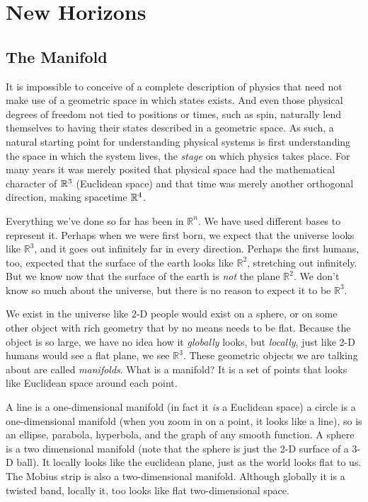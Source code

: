 	
	\chapter{New Horizons}
	
	\section{The Manifold} %
	\label{sec:the_manifold}

	It is impossible to conceive of a complete description of physics that need not make use of a geometric space in which states exists.  And even those physical degrees of freedom not tied to positions or times, such as spin, naturally lend themselves to having their states described in a geometric space.  As such, a natural starting point for understanding physical systems is first understanding the space in which the system lives, the \textit{stage} on which physics takes place.  For many years it was merely posited that physical space had the mathematical character of $\mathbb{R}^3$ (Euclidean space) and that time was merely another orthogonal direction, making spacetime $\mathbb{R}^4$. 

	Everything we've done so far has been in $\mathbb{R}^n$. We have used different bases to represent it. Perhaps when we were first born, we expect that the universe looks like $\mathbb{R}^3$, and it goes out infinitely far in every direction.  Perhaps the first humans, too, expected that the surface of the earth looks like $\mathbb R^2$, stretching out infinitely. But we know now that the surface of the earth is \emph{not} the plane $\mathbb R^2$. We don't know so much about the universe, but there is no reason to expect it to be $\mathbb R^3$.
	
	We exist in the universe like 2-D people would exist on a sphere, or on some other object with rich geometry that by no means needs to be flat. Because the object is so large, we have no idea how it \emph{globally} looks, but \emph{locally}, just like 2-D humans would see a flat plane, we see $\mathbb R^3$. These geometric objects we are talking about are called \emph{manifolds}. What is a manifold? It is a set of points that looks like Euclidean space around each point.
	
	A line is a one-dimensional manifold (in fact it \emph{is} a Euclidean space) a circle is a one-dimensional manifold (when you zoom in on a point, it looks like a line), so is an ellipse, parabola, hyperbola, and the graph of any smooth function. A sphere is a two dimensional manifold (note that the sphere is just the 2-D surface of a 3-D ball). It locally looks like the euclidean plane, just as the world looks flat to us. The Mobius strip is also a two-dimensional manifold. Although globally it is a twisted band, locally it, too looks like flat two-dimensional space.
	
